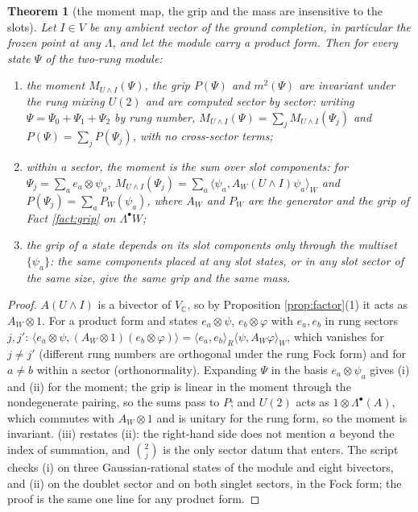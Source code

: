 \documentclass[11pt]{article}
\newtheorem{theorem}{Theorem}[section]
\theoremstyle{definition}
\newcommand{\C}{\mathbb{C}}
\newcommand{\ip}[2]{\langle #1, #2\rangle}
\begin{document}
\begin{theorem}[the moment map, the grip and the mass are insensitive to the slots]\label{thm:blind}
Let $I \in V$ be any ambient vector of the ground completion, in particular the frozen point at any $\Lambda$, and let the module carry a product form. Then for every state $\Psi$ of the two-rung module:
\begin{enumerate}
\item[(i)] the moment $M_{U \wedge I}(\Psi)$, the grip $P(\Psi)$ and $m^{2}(\Psi)$ are invariant under the rung mixing $U(2)$ and are computed sector by sector: writing $\Psi = \Psi_{0} + \Psi_{1} + \Psi_{2}$ by rung number, $M_{U \wedge I}(\Psi) = \sum_{j} M_{U \wedge I}(\Psi_{j})$ and $P(\Psi) = \sum_{j} P(\Psi_{j})$, with no cross-sector terms;
\item[(ii)] within a sector, the moment is the sum over slot components: for $\Psi_{j} = \sum_{a} e_{a} \otimes \psi_{a}$, $M_{U \wedge I}(\Psi_{j}) = \sum_{a} \ip{\psi_{a}}{A_{W}(U \wedge I)\psi_{a}}_{W}$ and $P(\Psi_{j}) = \sum_{a} P_{W}(\psi_{a})$, where $A_{W}$ and $P_{W}$ are the generator and the grip of Fact \ref{fact:grip} on $\Lambda^{\bullet}W$;
\item[(iii)] the grip of a state depends on its slot components only through the multiset $\{\psi_{a}\}$: the same components placed at any slot states, or in any slot sector of the same size, give the same grip and the same mass.
\end{enumerate}
\end{theorem}

\begin{proof}
$A(U \wedge I)$ is a bivector of $V_{\C}$, so by Proposition \ref{prop:factor}(1) it acts as $A_{W} \otimes 1$. For a product form and states $e_{a} \otimes \psi$, $e_{b} \otimes \varphi$ with $e_{a}, e_{b}$ in rung sectors $j, j'$: $\ip{e_{a} \otimes \psi}{(A_{W} \otimes 1)(e_{b} \otimes \varphi)} = \ip{e_{a}}{e_{b}}_{R}\ip{\psi}{A_{W}\varphi}_{W}$, which vanishes for $j \ne j'$ (different rung numbers are orthogonal under the rung Fock form) and for $a \ne b$ within a sector (orthonormality). Expanding $\Psi$ in the basis $e_{a} \otimes \psi_{a}$ gives (i) and (ii) for the moment; the grip is linear in the moment through the nondegenerate pairing, so the sums pass to $P$; and $U(2)$ acts as $1 \otimes \Lambda^{\bullet}(A)$, which commutes with $A_{W} \otimes 1$ and is unitary for the rung form, so the moment is invariant. (iii) restates (ii): the right-hand side does not mention $a$ beyond the index of summation, and $\binom{2}{j}$ is the only sector datum that enters. The script checks (i) on three Gaussian-rational states of the module and eight bivectors, and (ii) on the doublet sector and on both singlet sectors, in the Fock form; the proof is the same one line for any product form.
\end{proof}
\end{document}
